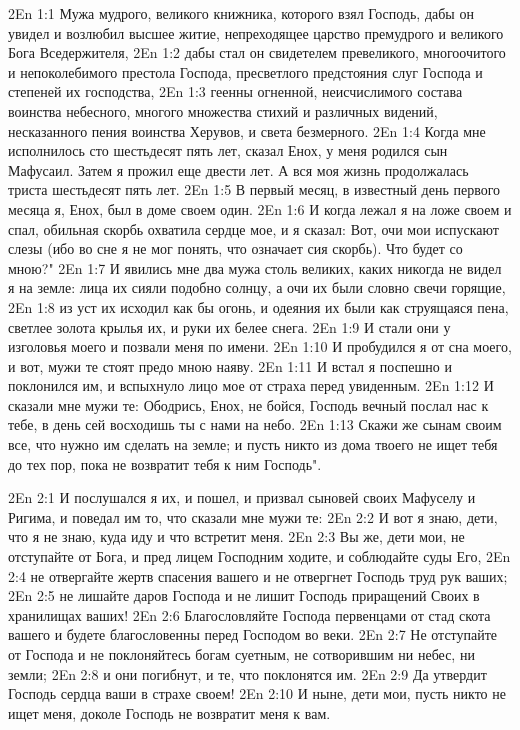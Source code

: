 \vs 2En 1:1
Мужа мудрого, великого книжника, которого взял Господь, дабы он увидел и возлюбил высшее житие, непреходящее царство премудрого и великого Бога Вседержителя,
\vs 2En 1:2
дабы стал он свидетелем превеликого, многоочитого и непоколебимого престола Господа, пресветлого предстояния слуг Господа и степеней их господства,
\vs 2En 1:3
геенны огненной, неисчислимого состава воинства небесного, многого множества стихий и различных видений, несказанного пения воинства Херувов, и света безмерного.
\vs 2En 1:4
Когда мне исполнилось сто шестьдесят пять лет, сказал Енох, у меня родился сын Мафусаил. Затем я прожил еще двести лет. А вся моя жизнь продолжалась триста шестьдесят пять лет.
\vs 2En 1:5
В первый месяц, в известный день первого месяца я, Енох, был в доме своем один.
\vs 2En 1:6
И когда лежал я на ложе своем и спал, обильная скорбь охватила сердце мое, и я сказал: Вот, очи мои испускают слезы (ибо во сне я не мог понять, что означает сия скорбь). Что будет со мною?"
\vs 2En 1:7
И явились мне два мужа столь великих, каких никогда не видел я на земле: лица их сияли подобно солнцу, а очи их были словно свечи горящие,
\vs 2En 1:8
из уст их исходил как бы огонь, и одеяния их были как струящаяся пена, светлее золота крылья их, и руки их белее снега.
\vs 2En 1:9
И стали они у изголовья моего и позвали меня по имени.
\vs 2En 1:10
И пробудился я от сна моего, и вот, мужи те стоят предо мною наяву.
\vs 2En 1:11
И встал я поспешно и поклонился им, и вспыхнуло лицо мое от страха перед увиденным.
\vs 2En 1:12
И сказали мне мужи те: Ободрись, Енох, не бойся, Господь вечный послал нас к тебе, в день сей восходишь ты с нами на небо.
\vs 2En 1:13
Скажи же сынам своим все, что нужно им сделать на земле; и пусть никто из дома твоего не ищет тебя до тех пор, пока не возвратит тебя к ним Господь".

\vs 2En 2:1
И послушался я их, и пошел, и призвал сыновей своих Мафуселу и Ригима, и поведал им то, что сказали мне мужи те:
\vs 2En 2:2
И вот я знаю, дети, что я не знаю, куда иду и что встретит меня.
\vs 2En 2:3
Вы же, дети мои, не отступайте от Бога, и пред лицем Господним ходите, и соблюдайте суды Его,
\vs 2En 2:4
не отвергайте жертв спасения вашего и не отвергнет Господь труд рук ваших;
\vs 2En 2:5
не лишайте даров Господа и не лишит Господь приращений Своих в хранилищах ваших!
\vs 2En 2:6
Благословляйте Господа первенцами от стад скота вашего и будете благословенны перед Господом во веки.
\vs 2En 2:7
Не отступайте от Господа и не поклоняйтесь богам суетным, не сотворившим ни небес, ни земли;
\vs 2En 2:8
и они погибнут, и те, что поклонятся им.
\vs 2En 2:9
Да утвердит Господь сердца ваши в страхе своем!
\vs 2En 2:10
И ныне, дети мои, пусть никто не ищет меня, доколе Господь не возвратит меня к вам.

